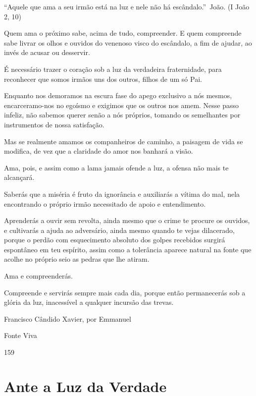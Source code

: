 \documentclass[12pt,a4paper]{article}
\begin{document}
		\textquotedblleft Aquele que ama a seu irm\~ao est\'a na luz e nele n\~ao h\'a esc\^andalo.\textquotedblright\, Jo\~ao. (I Jo\~ao 2, 10)

		Quem ama o pr\'oximo sabe, acima de tudo, compreender. E quem compreende sabe livrar os olhos e ouvidos do venenoso visco do esc\^andalo, a fim de ajudar, ao inv\'es de acusar ou desservir.

		\'E necess\'ario trazer o cora\c{c}\~ao sob a luz da verdadeira fraternidade, para reconhecer que somos irm\~aos uns dos outros, filhos de um s\'o Pai.

		Enquanto nos demoramos na escura fase do apego exclusivo a n\'os mesmos, encarceramo-nos no ego\'ismo e exigimos que os outros nos amem. Nesse passo infeliz, n\~ao sabemos querer sen\~ao a n\'os pr\'oprios, tomando os semelhantes por instrumentos de nossa satisfa\c{c}\~ao.

		Mas se realmente amamos os companheiros de caminho, a paisagem de vida se modifica, de vez que a claridade do amor nos banhar\'a a vis\~ao.

		Ama, pois, e assim como a lama jamais ofende a luz, a ofensa n\~ao mais te alcan\c{c}ar\'a.

		Saber\'as que a mis\'eria \'e fruto da ignor\^ancia e auxiliar\'as a v\'itima do mal, nela encontrando o pr\'oprio irm\~ao necessitado de apoio e entendimento.

		Aprender\'as a ouvir sem revolta, ainda mesmo que o crime te procure os ouvidos, e cultivar\'as a ajuda ao advers\'ario, ainda mesmo quando te vejas dilacerado, porque o perd\~ao com esquecimento absoluto dos golpes recebidos surgir\'a espont\^aneo em teu esp\'irito, assim como a toler\^ancia aparece natural na fonte que acolhe no pr\'oprio seio as pedras que lhe atiram.

		Ama e compreender\'as.

		Compreende e servir\'as sempre mais cada dia, porque ent\~ao permanecer\'as sob a gl\'oria da luz, inacess\'ivel a qualquer incurs\~ao das trevas.

		Francisco C\^andido Xavier, por Emmanuel

		Fonte Viva

		159

	\section{Ante a Luz da Verdade}
		\begin{flushright}
		\end{flushright}
\end{document}
